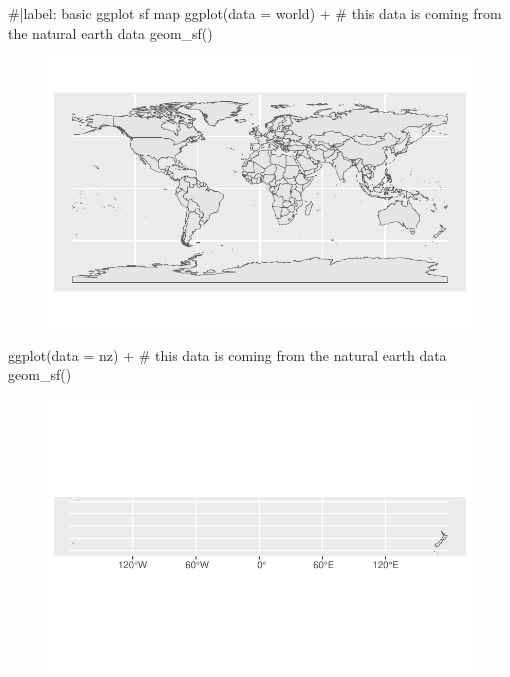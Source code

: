 \documentclass[
  letterpaper,
  DIV=11,
  numbers=noendperiod]{scrartcl}
\newenvironment{Shaded}{\begin{snugshade}}{\end{snugshade}}
\newcommand{\AttributeTok}[1]{\textcolor[rgb]{0.40,0.45,0.13}{#1}}
\newcommand{\CommentTok}[1]{\textcolor[rgb]{0.37,0.37,0.37}{#1}}
\newcommand{\FunctionTok}[1]{\textcolor[rgb]{0.28,0.35,0.67}{#1}}
\newcommand{\NormalTok}[1]{\textcolor[rgb]{0.00,0.23,0.31}{#1}}
\newcommand{\SpecialCharTok}[1]{\textcolor[rgb]{0.37,0.37,0.37}{#1}}
\begin{document}
\begin{Shaded}
\begin{Highlighting}[]
\CommentTok{\#|label: basic ggplot sf map}
\FunctionTok{ggplot}\NormalTok{(}\AttributeTok{data =}\NormalTok{ world) }\SpecialCharTok{+}     \CommentTok{\# this data is coming from the natural earth data}
  \FunctionTok{geom\_sf}\NormalTok{()}
\end{Highlighting}
\end{Shaded}

\begin{figure}[H]

{\centering \includegraphics{Introduction-to-mapping_files/figure-pdf/unnamed-chunk-6-1.pdf}

}

\end{figure}

\begin{Shaded}
\begin{Highlighting}[]
\FunctionTok{ggplot}\NormalTok{(}\AttributeTok{data =}\NormalTok{ nz) }\SpecialCharTok{+}     \CommentTok{\# this data is coming from the natural earth data}
  \FunctionTok{geom\_sf}\NormalTok{()}
\end{Highlighting}
\end{Shaded}

\begin{figure}[H]

{\centering \includegraphics{Introduction-to-mapping_files/figure-pdf/unnamed-chunk-6-2.pdf}

}

\end{figure}
\end{document}

